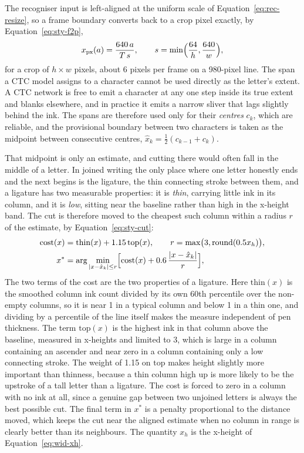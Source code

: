 The recogniser input is left-aligned at the uniform scale of Equation~\ref{eq:rec-resize}, so a frame boundary converts back to a crop pixel exactly, by Equation~\ref{eq:sty-f2p},
\begin{equation}
x_{\mathrm{px}}(a)=\frac{640\,a}{T\,s},\qquad s=\min\Bigl(\frac{64}{h},\frac{640}{w}\Bigr),
\label{eq:sty-f2p}
\end{equation}
for a crop of $h\times w$ pixels, about 6 pixels per frame on a 980-pixel line.
The span a CTC model assigns to a character cannot be used directly as the letter's extent. A CTC network is free to emit a character at any one step inside its true extent and blanks elsewhere, and in practice it emits a narrow sliver that lags slightly behind the ink. The spans are therefore used only for their \emph{centres} $c_k$, which are reliable, and the provisional boundary between two characters is taken as the midpoint between consecutive centres, $\hat x_k=\tfrac12(c_{k-1}+c_k)$.

That midpoint is only an estimate, and cutting there would often fall in the middle of a letter. In joined writing the only place where one letter honestly ends and the next begins is the ligature, the thin connecting stroke between them, and a ligature has two measurable properties: it is \emph{thin}, carrying little ink in its column, and it is \emph{low}, sitting near the baseline rather than high in the x-height band. The cut is therefore moved to the cheapest such column within a radius $r$ of the estimate, by Equation~\ref{eq:sty-cut}:
\begin{equation}
\begin{aligned}
\mathrm{cost}(x)&=\mathrm{thin}(x)+1.15\,\mathrm{top}(x),\qquad r=\max\bigl(3,\mathrm{round}(0.5x_h)\bigr),\\
x^*&=\arg\min_{|x-\hat x_k|\le r}\Bigl[\mathrm{cost}(x)+0.6\,\frac{|x-\hat x_k|}{r}\Bigr],
\end{aligned}
\label{eq:sty-cut}
\end{equation}
The two terms of the cost are the two properties of a ligature. Here $\mathrm{thin}(x)$ is the smoothed column ink count divided by its own 60th percentile over the non-empty columns, so it is near 1 in a typical column and below 1 in a thin one, and dividing by a percentile of the line itself makes the measure independent of pen thickness. The term $\mathrm{top}(x)$ is the highest ink in that column above the baseline, measured in x-heights and limited to 3, which is large in a column containing an ascender and near zero in a column containing only a low connecting stroke. The weight of 1.15 on $\mathrm{top}$ makes height slightly more important than thinness, because a thin column high up is more likely to be the upstroke of a tall letter than a ligature. The cost is forced to zero in a column with no ink at all, since a genuine gap between two unjoined letters is always the best possible cut. The final term in $x^*$ is a penalty proportional to the distance moved, which keeps the cut near the aligned estimate when no column in range is clearly better than its neighbours. The quantity $x_h$ is the x-height of Equation~\ref{eq:wid-xh}.

